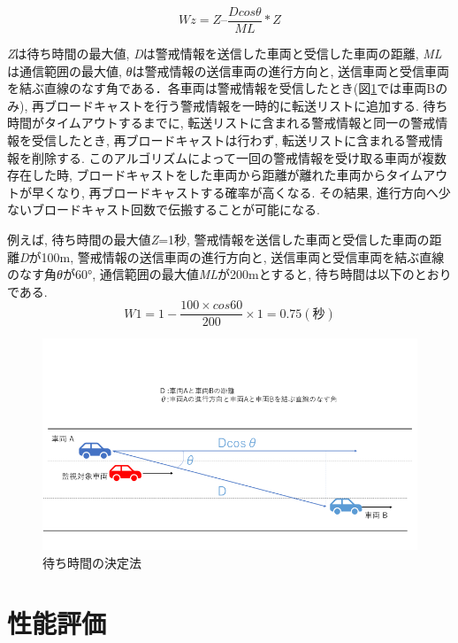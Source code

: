 \documentclass[10pt]{jreport}
\begin{document}
\begin{equation}
Wz = Z – \dfrac{Dcosθ}{ML} * Z
\end{equation}

{\it Z}は待ち時間の最大値, {\it D}は警戒情報を送信した車両と受信した車両の距離, {\it ML}は通信範囲の最大値, {\it θ}は警戒情報の送信車両の進行方向と, 送信車両と受信車両を結ぶ直線のなす角である．各車両は警戒情報を受信したとき(図\ref{fig:waittime}では車両Bのみ), 再ブロードキャストを行う警戒情報を一時的に転送リストに追加する. 待ち時間がタイムアウトするまでに, 転送リストに含まれる警戒情報と同一の警戒情報を受信したとき, 再ブロードキャストは行わず, 転送リストに含まれる警戒情報を削除する. このアルゴリズムによって一回の警戒情報を受け取る車両が複数存在した時, ブロードキャストをした車両から距離が離れた車両からタイムアウトが早くなり, 再ブロードキャストする確率が高くなる. その結果, 進行方向へ少ないブロードキャスト回数で伝搬することが可能になる. 

例えば, 待ち時間の最大値{\it Z}=1秒, 警戒情報を送信した車両と受信した車両の距離{\it D}が100m, 警戒情報の送信車両の進行方向と, 送信車両と受信車両を結ぶ直線のなす角{\it θ}が60°, 通信範囲の最大値{\it ML}が200mとすると, 待ち時間は以下のとおりである.
\begin{equation*}
W1=1 - \dfrac{100 × cos60}{200} × 1 = 0.75(秒)
\end{equation*}

\begin{figure}[H]
\centering
\includegraphics[width=12cm]{figures/3_3.png}
\caption{待ち時間の決定法}
\label{fig:waittime}
\end{figure}


\chapter{性能評価}
\vspace{-5mm}
\end{document}
